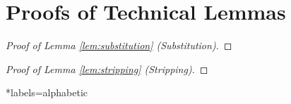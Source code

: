 \documentclass[reqno, twoside]{article}
\begin{document}
    \appendix

    \section{Proofs of Technical Lemmas}

    \begin{proof}[Proof of Lemma \ref{lem:substitution} (Substitution)]
        \TODO
    \end{proof}

    \begin{proof}[Proof of Lemma \ref{lem:stripping} (Stripping)]
        \TODO
    \end{proof}

    \begin{bibdiv}
        \begin{biblist}*{labels={alphabetic}}
        \end{biblist}
    \end{bibdiv}
\end{document}
